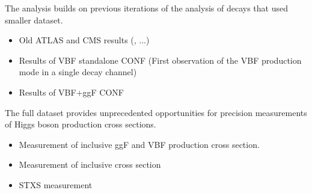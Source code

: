 The analysis builds on previous iterations of the analysis of \HWW decays that used smaller dataset.

\begin{itemize}
    \item Old ATLAS and CMS results (\cite{HIGG-2013-13}, ...)
    \item Results of VBF standalone CONF (First observation of the VBF production mode in a single decay channel)
    \item Results of VBF+ggF CONF
\end{itemize}

The full \RunTwo dataset provides unprecedented opportunities for precision measurements of Higgs boson production cross sections.
\begin{itemize}
    \item Measurement of inclusive ggF and VBF production cross section.
    \item Measurement of inclusive cross section
    \item STXS measurement
\end{itemize}

